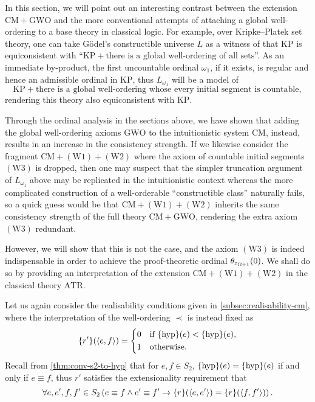 \documentclass[11pt]{article}
\theoremstyle{plain}
\theoremstyle{definition}
\newcommand{\tuple}[1]{\left\langle #1 \right\rangle}
\begin{document}
In this section, we will point out an interesting contrast between the extension $\mathrm{CM} + \mathrm{GWO}$ and the more conventional attempts of attaching a global well-ordering to a base theory in classical logic. For example, over Kripke--Platek set theory, one can take G\"odel's constructible universe $L$ as a witness of that $\mathrm{KP}$ is equiconsistent with ``$\mathrm{KP} + \text{there is a global well-ordering of all sets}$''. As an immediate by-product, the first uncountable ordinal $\omega_1$, if it exists, is regular and hence an admissible ordinal in $\mathrm{KP}$, thus $L_{\omega_1}$ will be a model of
\[\mathrm{KP} + \text{there is a global well-ordering whose every initial segment is countable},\]
rendering this theory also equiconsistent with $\mathrm{KP}$.

Through the ordinal analysis in the sections above, we have shown that adding the global well-ordering axioms $\mathrm{GWO}$ to the intuitionistic system $\mathrm{CM}$, instead, results in an increase in the consistency strength. If we likewise consider the fragment $\mathrm{CM} + \left(\mathrm{W}1\right) + \left(\mathrm{W}2\right)$ where the axiom of countable initial segments $\left(\mathrm{W}3\right)$ is dropped, then one may suspect that the simpler truncation argument of $L_{\omega_1}$ above may be replicated in the intuitionistic context whereas the more complicated construction of a well-orderable ``constructible class'' naturally fails, so a quick guess would be that $\mathrm{CM} + \left(\mathrm{W}1\right) + \left(\mathrm{W}2\right)$ inherits the same consistency strength of the full theory $\mathrm{CM} + \mathrm{GWO}$, rendering the extra axiom $\left(\mathrm{W}3\right)$ redundant.

However, we will show that this is not the case, and the axiom $\left(\mathrm{W}3\right)$ is indeed indispensable in order to achieve the proof-theoretic ordinal $\theta_{\varepsilon_{\Omega + 1}}\mleft(0\mright)$. We shall do so by providing an interpretation of the extension $\mathrm{CM} + \left(\mathrm{W}1\right) + \left(\mathrm{W}2\right)$ in the classical theory $\mathrm{ATR}$.

Let us again consider the realisability conditions given in \autoref{subsec:realisability-cm}, where the interpretation of the well-ordering $\prec$ is instead fixed as
\[\mleft\{r'\mright\}\mleft(\tuple{e, f}\mright) = \left\{\begin{aligned}
         & 0 &  & \text{if} \ \mleft\{\mathrm{hyp}\mright\}\mleft(e\mright) < \mleft\{\mathrm{hyp}\mright\}\mleft(e\mright), \\
         & 1 &  & \text{otherwise}.
    \end{aligned}\right.\]
Recall from \autoref{thm:conv-s2-to-hyp} that for $e, f \in S_2$, $\mleft\{\mathrm{hyp}\mright\}\mleft(e\mright) = \mleft\{\mathrm{hyp}\mright\}\mleft(e\mright)$ if and only if $e \equiv f$, thus $r'$ satisfies the extensionality requirement that
\[\forall e, e', f, f' \in S_2 \left(e \equiv f \land e' \equiv f' \rightarrow \mleft\{r\mright\}\mleft(\tuple{e, e'}\mright) = \mleft\{r\mright\}\mleft(\tuple{f, f'}\mright)\right).\]
\end{document}

